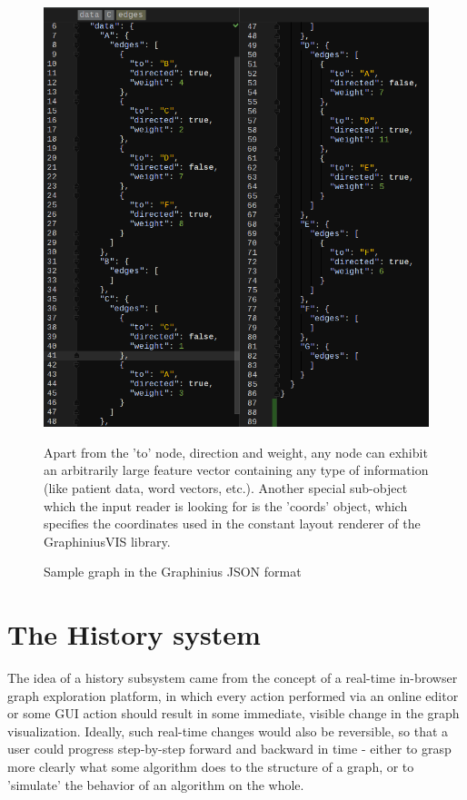 		\begin{figure}[H]
			\centering
			\hspace*{-1.5cm}
			\includegraphics[width=1.2\textwidth]{figures/search_graph_json}
			\caption{Sample graph in the Graphinius JSON format}
			\label{fig:json_input_graph}
			\small Apart from the 'to' node, direction and weight, any node can exhibit an arbitrarily large feature vector containing any type of information (like patient data, word vectors, etc.). Another special sub-object which the input reader is looking for is the 'coords' object, which specifies the coordinates used in the constant layout renderer of the GraphiniusVIS library.
		\end{figure}



\section{The History system}
\label{sect:op_log}

	The idea of a history subsystem came from the concept of a real-time in-browser graph exploration platform, in which every action performed via an online editor or some GUI action should result in some immediate, visible change in the graph visualization. Ideally, such real-time changes would also be reversible, so that a user could progress step-by-step forward and backward in time - either to grasp more clearly what some algorithm does to the structure of a graph, or to 'simulate' the behavior of an algorithm on the whole. 
	
